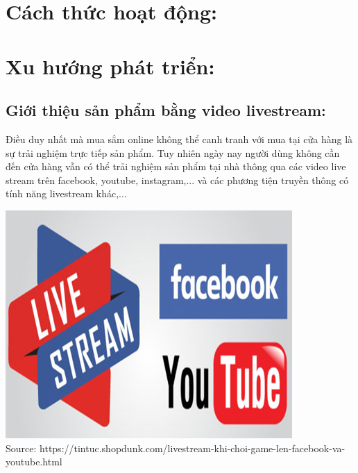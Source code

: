 \documentclass[13pt,a4paper]{article}
\begin{document}
\section{Cách thức hoạt động:} 
\section{Xu hướng phát triển:}
    \subsection{Giới thiệu sản phẩm bằng video livestream:}
    Điều duy nhất mà mua sắm online không thể canh tranh với mua tại cửa hàng là sự trải nghiệm trực tiếp sản phẩm. Tuy nhiên ngày nay người dùng không cần đến cửa hàng vẫn có thể trải nghiệm sản phẩm tại nhà thông qua các video live stream trên facebook, youtube, instagram,... và các phương tiện truyền thông có tính năng livestream khác,...\\
    \begin{center}
    \includegraphics[scale=0.6]{images/f&u.png} \\
    \fontsize{10pt}{1.2pt}\selectfont
    Source: https://tintuc.shopdunk.com/livestream-khi-choi-game-len-facebook-va-youtube.html
    \end{center}
\end{document}
